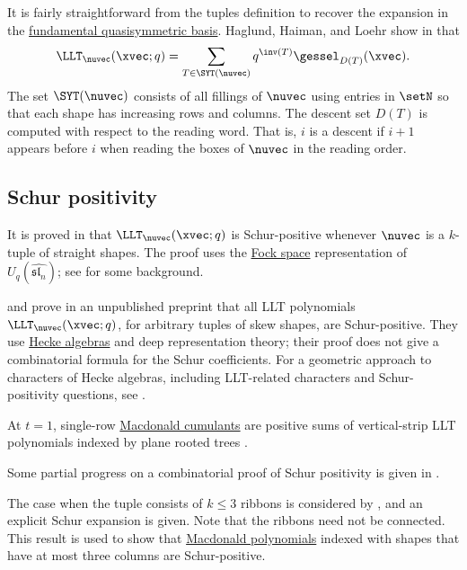 It is fairly straightforward from the tuples definition to recover the
expansion in the \hyperref[gessel]{fundamental quasisymmetric basis}.
Haglund, Haiman, and Loehr show in \cite{HaglundHaimanLoehr2005} that
\[
\LLT_\nuvec(\xvec;q) = \sum_{T \in \SYT(\nuvec)} q^{\inv(T)} \gessel_{D(T)}(\xvec).
\]
The set $\SYT(\nuvec)$ consists of all fillings of $\nuvec$ using entries
in $\setN$ so that each shape has increasing rows and columns.
The descent set $D(T)$ is computed with respect to the reading word.
That is, $i$ is a descent if $i+1$ appears before $i$ when reading the boxes of
$\nuvec$ in the reading order.


\subsection[lltSchurPositivity]{Schur positivity}

It is proved in \cite{LeclercThibon2000} that $\LLT_\nuvec(\xvec;q)$ is
Schur-positive whenever $\nuvec$ is a $k$-tuple of straight shapes.
The proof uses the \hyperref[fockSpace]{Fock space} representation of
$U_q(\widehat{\mathfrak{sl}_n})$; see \cite{Iijima2013} for some background.

 and  prove in an unpublished preprint
\cite{GrojnowskiHaiman2006} that all LLT polynomials
$\LLT_\nuvec(\xvec;q)$, for arbitrary tuples of skew shapes, are
Schur-positive.
They use \hyperref[heckeAlgebra]{Hecke algebras} and deep representation
theory; their proof does not give a combinatorial formula for the Schur
coefficients.
For a geometric approach to characters of Hecke algebras, including
LLT-related characters and Schur-positivity questions, see
\cite{AbreuNigro2025}.

At $t=1$, single-row
\hyperref[singleRowMacdonaldCumulantLLTPositivity]{Macdonald cumulants} are
positive sums of vertical-strip LLT polynomials indexed by plane rooted
trees \cite[Thm.~1.3 and Cor.~1.4]{HaglundTewari2026x}.

Some partial progress on a combinatorial proof of Schur positivity is given in
\cite{Roberts2013}.


The case when the tuple consists of $k\leq 3$ ribbons is considered by
 \cite{Blasiak2016}, and an explicit Schur expansion is
given.  Note that the ribbons need not be connected.
This result is used to show that \hyperref[macdonaldPolynomialDefinition]{Macdonald
polynomials} indexed with shapes that have at most three columns are
Schur-positive.


